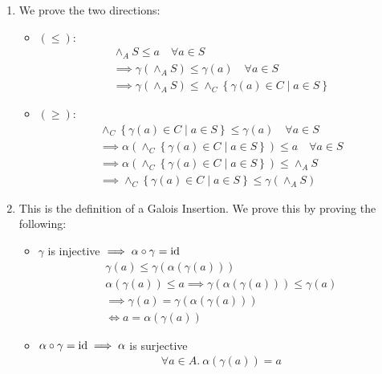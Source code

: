 \begin{exercise}
\begin{enumerate}[(1)]
        \item We prove the two directions:
        \begin{itemize}
            \item $(\leq)$:
            \begin{gather*}
                \wedge_A S \leq a \quad \forall a \in S \\
                \implies \gamma(\wedge_A S) \leq \gamma(a) \quad \forall a \in S \\
                \implies \gamma(\wedge_A S) \leq \wedge_C \left\{\gamma(a) \in C \mid a \in S\right\}
            \end{gather*}
            \item $(\geq)$:
            \begin{gather*}
                \wedge_C \left\{\gamma(a) \in C \mid a \in S\right\} \leq \gamma(a) \quad \forall a \in S \\
                \implies \alpha(\wedge_C \left\{\gamma(a) \in C \mid a \in S\right\}) \leq a \quad \forall a \in S \\
                \implies \alpha(\wedge_C \left\{\gamma(a) \in C \mid a \in S\right\}) \leq \wedge_A S \\
                \implies \wedge_C \left\{\gamma(a) \in C \mid a \in S\right\} \leq \gamma(\wedge_A S)
            \end{gather*}
        \end{itemize}
        \item This is the definition of a Galois Insertion. We prove this by proving the following:
        \begin{itemize}
            \item $\gamma$ is injective $\implies \alpha \circ \gamma = \operatorname{id}$
            \begin{gather*}
                \gamma(a) \leq \gamma(\alpha(\gamma(a))) \\
                \alpha(\gamma(a)) \leq a
                \implies \gamma(\alpha(\gamma(a))) \leq \gamma(a) \\
                \implies \gamma(a) = \gamma(\alpha(\gamma(a))) \\
                \iff a = \alpha(\gamma(a))
            \end{gather*}
            \item $\alpha \circ \gamma = \operatorname{id} \implies \alpha$ is surjective
            \begin{gather*}
                \forall a \in A.\ \alpha(\gamma(a)) = a \\

\end{gather*}
\end{itemize}
\end{enumerate}
\end{exercise}
